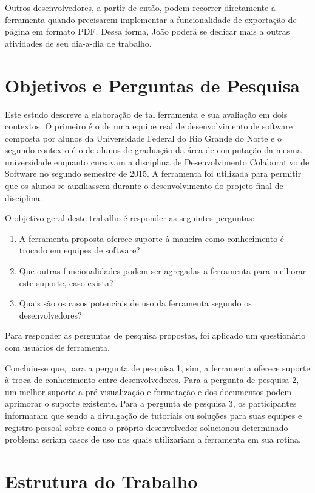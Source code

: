 Outros desenvolvedores, a partir de então, podem recorrer diretamente a ferramenta quando precisarem implementar a funcionalidade de exportação de página em formato PDF. Dessa forma, João poderá se dedicar mais a outras atividades de seu dia-a-dia de trabalho.

\section{Objetivos e Perguntas de Pesquisa}

Este estudo descreve a elaboração de tal ferramenta e sua avaliação em dois contextos. O primeiro é o de uma equipe real de desenvolvimento de software composta por alunos da Universidade Federal do Rio Grande do Norte e o segundo contexto é o de alunos de graduação da área de computação da mesma universidade enquanto cursavam a disciplina de Desenvolvimento Colaborativo de Software no segundo semestre de 2015. A ferramenta foi utilizada para permitir que os alunos se auxiliassem durante o desenvolvimento do projeto final de disciplina.

O objetivo geral deste trabalho é responder as seguintes perguntas:

\begin{enumerate}
  \item A ferramenta proposta oferece suporte à maneira como conhecimento é trocado em equipes de software?
  \item Que outras funcionalidades podem ser agregadas a ferramenta para melhorar este suporte, caso exista?
  \item Quais são os casos potenciais de uso da ferramenta segundo os desenvolvedores?
\end{enumerate}

Para responder as perguntas de pesquisa propostas, foi aplicado um questionário com usuários de ferramenta.

Concluiu-se que, para a pergunta de pesquisa 1, sim, a ferramenta oferece suporte à troca de conhecimento entre desenvolvedores. Para a pergunta de pesquisa 2, um melhor suporte a pré-visualização e formatação e dos documentos podem aprimorar o suporte existente. Para a pergunta de pesquisa 3, os participantes informaram que sendo a divulgação de tutoriais ou soluções para suas equipes e registro pessoal sobre como o próprio desenvolvedor solucionou determinado problema seriam casos de uso nos quais utilizariam a ferramenta em sua rotina.

\section{Estrutura do Trabalho}

